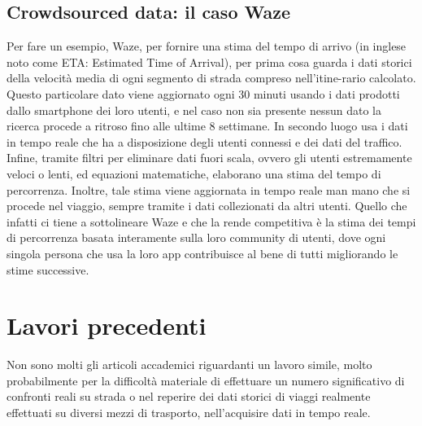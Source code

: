 \subsection{Crowdsourced data: il caso Waze}

Per fare un esempio, Waze, per fornire una stima del tempo di arrivo (in inglese noto come ETA: Estimated Time of Arrival), per prima cosa guarda i dati storici della velocità media di ogni segmento di strada compreso nell'itine-rario calcolato. Questo particolare dato viene aggiornato ogni 30 minuti usando i dati prodotti dallo smartphone dei loro utenti, e nel caso non sia presente nessun dato la ricerca procede a ritroso fino alle ultime 8 settimane. In secondo luogo usa i dati in tempo reale che ha a disposizione degli utenti connessi e dei dati del traffico. Infine, tramite filtri per eliminare dati fuori scala, ovvero gli utenti estremamente veloci o lenti, ed equazioni matematiche, elaborano una stima del tempo di percorrenza. Inoltre, tale stima viene aggiornata in tempo reale man mano che si procede nel viaggio, sempre tramite i dati collezionati da altri utenti. Quello che infatti ci tiene a sottolineare Waze e che la rende competitiva è la stima dei tempi di percorrenza basata interamente sulla loro community di utenti, dove ogni singola persona che usa la loro app contribuisce al bene di tutti migliorando le stime successive\cite{wazeblog}.

\section{Lavori precedenti}

Non sono molti gli articoli accademici riguardanti un lavoro simile, molto probabilmente per la difficoltà materiale di effettuare un numero significativo di confronti reali su strada o nel reperire dei dati storici di viaggi realmente effettuati su diversi mezzi di trasporto, nell'acquisire dati in tempo reale.






















